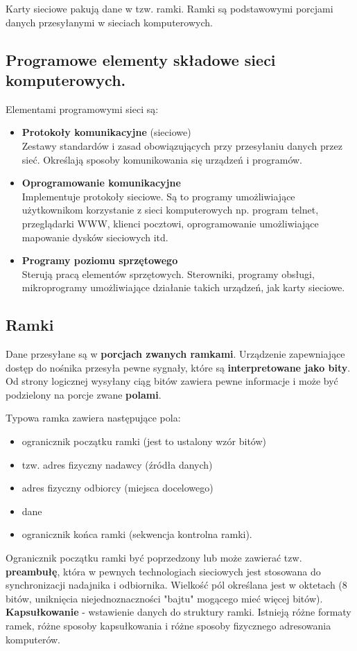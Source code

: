 \documentclass[../main.tex]{subfiles}
\begin{document}
    Karty	sieciowe	pakują	dane	w	tzw.	ramki. Ramki	są	podstawowymi	porcjami	danych	przesyłanymi	w	sieciach	komputerowych.


    \subsection{Programowe	elementy	składowe	sieci	komputerowych.}
    Elementami	programowymi	sieci	są:
    \begin{itemize}
        \item \textbf{Protokoły	 komunikacyjne} (sieciowe)\\
        Zestawy standardów i zasad obowiązujących przy	 przesyłaniu danych	przez	sieć. Określają sposoby komunikowania się urządzeń	i	programów.
        \item \textbf{Oprogramowanie	komunikacyjne}\\
        Implementuje protokoły sieciowe. Są to programy	 umożliwiające	 użytkownikom	 korzystanie	 z
        sieci	 komputerowych	 np. program telnet, przeglądarki WWW, klienci pocztowi, oprogramowanie	umożliwiające mapowanie	dysków	sieciowych	itd.
        \item \textbf{Programy	 poziomu	 sprzętowego}\\
        Sterują pracą elementów	 sprzętowych. Sterowniki, programy	 obsługi, mikroprogramy umożliwiające	działanie	takich	urządzeń,	jak	karty	sieciowe.
    \end{itemize}

    \subsection{Ramki}
    Dane przesyłane są w \textbf{porcjach zwanych ramkami}. Urządzenie	zapewniające dostęp	do nośnika przesyła	pewne sygnały, które są \textbf{interpretowane jako bity}. Od strony	logicznej wysyłany	ciąg bitów zawiera	pewne informacje i może	być	podzielony na porcje zwane \textbf{polami}.

    Typowa ramka zawiera następujące pola:
    \begin{itemize}
        \item ogranicznik początku ramki (jest	to	ustalony	wzór	bitów)
        \item tzw.	adres fizyczny nadawcy (źródła	danych)
        \item adres	fizyczny odbiorcy (miejsca	docelowego)
        \item dane
        \item ogranicznik końca	ramki (sekwencja	kontrolna	ramki).
    \end{itemize}
    Ogranicznik	 początku ramki być poprzedzony lub może zawierać tzw. \textbf{preambułę}, która w pewnych technologiach sieciowych jest stosowana do synchronizacji nadajnika i
    odbiornika. Wielkość pól określana jest w oktetach (8 bitów, uniknięcia niejednoznaczności "bajtu" mogącego mieć więcej bitów). \textbf{Kapsułkowanie} - wstawienie danych do struktury ramki. Istnieją różne formaty ramek, różne sposoby kapsułkowania i różne sposoby fizycznego adresowania komputerów.
\end{document}

